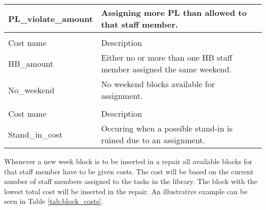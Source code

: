 \begin{table}[!h]
\begin{tabular}{|l|l|}
PL\_violate\_amount             & Assigning more PL than allowed to that staff member.                  \\ \hline
\rowcolor[HTML]{FD6864} 
\multicolumn{2}{|l|}{\cellcolor{corn} \textbf{Weekend costs}} \\ \hline
\rowcolor[HTML]{C0C0C0} 
Cost name                                      & Description       \\ \hline
HB\_amount                       & Either no or more than one HB staff member assigned the same weekend.   \\ \hline
No\_weekend                & No weekend blocks available for assignment.                  \\ \hline
\rowcolor[HTML]{FD6864} 
\multicolumn{2}{|l|}{\cellcolor{corn} \textbf{Stand-in costs}} \\ \hline
\rowcolor[HTML]{C0C0C0} 
Cost name                                      & Description       \\ \hline
Stand\_in\_cost                     & Occuring when a possible stand-in is ruined due to an assignment.    \\ \hline
\end{tabular}
\end{table}

Whenever a new week block is to be inserted in a repair all available blocks for that staff member have to be given costs. The cost will be based on the current number of staff members assigned to the tasks in the library. The block with the lowest total cost will be inserted in the repair. An illustrative example can be seen in Table \ref{tab:block_costs}.

